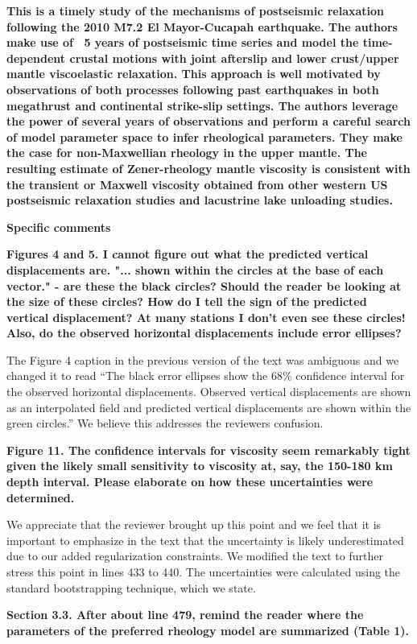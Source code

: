 \documentclass[10pt,a4paper]{letter}
\begin{document}
\begin{letter}{}
\textbf{This is a timely study of the mechanisms of postseismic relaxation following the 2010 M7.2 El Mayor-Cucapah earthquake. The authors make use of ~5 years of postseismic time series and model the time-dependent crustal motions with joint afterslip and lower crust/upper mantle viscoelastic relaxation. This approach is well motivated by observations of both processes following past earthquakes in both megathrust and continental strike-slip settings. The authors leverage the power of several years of observations and perform a careful search of model parameter space to infer rheological parameters. They make the case for non-Maxwellian rheology in the upper mantle. The resulting estimate of Zener-rheology mantle viscosity is consistent with the transient or Maxwell viscosity obtained from other western US postseismic relaxation studies and lacustrine lake unloading studies.}

\textbf{Specific comments}

\textbf{Figures 4 and 5. I cannot figure out what the predicted vertical displacements are. "... shown within the circles at the base of each vector." - are these the black circles? Should the reader be looking at the size of these circles? How do I tell the sign of the predicted vertical displacement? At many stations I don't even see these circles! Also, do the observed horizontal displacements include error ellipses?}

The Figure 4 caption in the previous version of the text was ambiguous and we changed it to read “The black error ellipses show the 68\% confidence interval for the observed horizontal displacements.  Observed vertical displacements are shown as an interpolated field and predicted vertical displacements are shown within the green circles.”  We believe this addresses the reviewers confusion. 

\textbf{Figure 11. The confidence intervals for viscosity seem remarkably tight given the likely small sensitivity to viscosity at, say, the 150-180 km depth interval. Please elaborate on how these uncertainties were determined.}

We appreciate that the reviewer brought up this point and we feel that it is important to emphasize in the text that the uncertainty is likely underestimated due to our added regularization constraints.  We modified the text to further stress this point in lines 433 to 440.  The uncertainties were calculated using the standard bootstrapping technique, which we state.    

\textbf{Section 3.3. After about line 479, remind the reader where the parameters of the preferred rheology model are summarized (Table 1).}


\end{letter}
\end{document}

